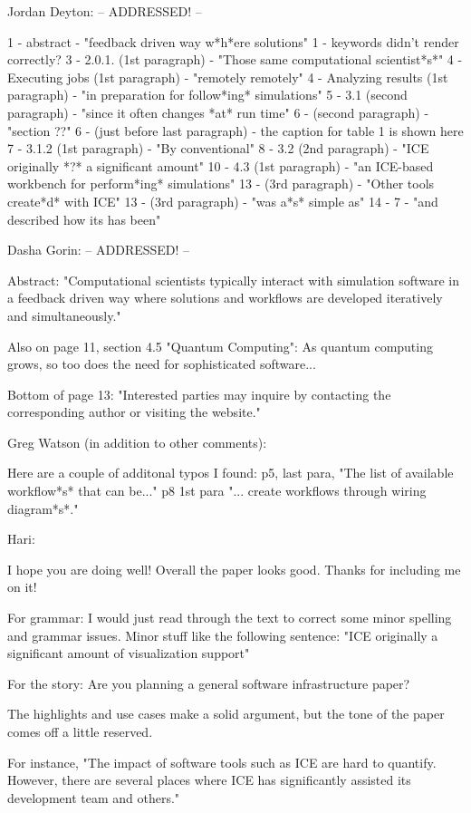 Jordan Deyton: -- ADDRESSED! --

1 - abstract - "feedback driven way w*h*ere solutions"
1 - keywords didn't render correctly?
3 - 2.0.1. (1st paragraph) - "Those same computational scientist*s*"
4 - Executing jobs (1st paragraph) - "remotely remotely"
4 - Analyzing results (1st paragraph) - "in preparation for follow*ing* simulations"
5 - 3.1 (second paragraph) - "since it often changes *at* run time"
6 - (second paragraph) - "section ??"
6 - (just before last paragraph) - the caption for table 1 is shown here
7 - 3.1.2 (1st paragraph) - "By conventional"
8 - 3.2 (2nd paragraph) - "ICE originally *?* a significant amount"
10 - 4.3 (1st paragraph) - "an ICE-based workbench for perform*ing* simulations"
13 - (3rd paragraph) - "Other tools create*d* with ICE"
13 - (3rd paragraph) - "was a*s* simple as"
14 - 7 - "and described how its has been"

Dasha Gorin: -- ADDRESSED! --

Abstract:
"Computational scientists typically interact with simulation software in a feedback driven way where solutions and workflows are developed iteratively and simultaneously." 

Also on page 11, section 4.5 "Quantum Computing":
As quantum computing grows, so too does the need for sophisticated software...

Bottom of page 13:
"Interested parties may inquire by contacting the corresponding author or visiting the website."

Greg Watson (in addition to other comments):

Here are a couple of additonal typos I found:
p5, last para, "The list of available workflow*s* that can be..."
p8 1st para "... create workflows through wiring diagram*s*."

Hari:

I hope you are doing well! Overall the paper looks good. Thanks for including me on it!

For grammar: I would just read through the text to correct some minor spelling and grammar issues. Minor stuff like the following sentence: "ICE originally a significant amount of visualization support"

For the story: Are you planning a general software infrastructure paper? 

The highlights and use cases make a solid argument, but the tone of the paper comes off a little reserved.

For instance,  "The impact of software tools such as ICE are hard to quantify. However, there are several places where ICE has significantly assisted its development team and others."

